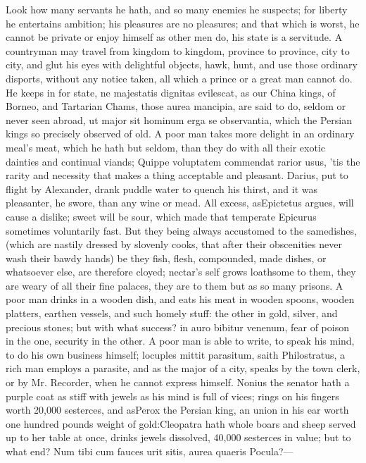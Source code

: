 {Look how many servants he hath, and so many enemies he suspects; for
liberty he entertains ambition; his pleasures are no pleasures; and
that which is worst, he cannot be private or enjoy himself as other men
do, his state is a servitude. A countryman may travel from
kingdom to kingdom, province to province, city to city, and glut his
eyes with delightful objects, hawk, hunt, and use those ordinary
disports, without any notice taken, all which a prince or a great man
cannot do. He keeps in for state, ne majestatis dignitas evilescat, as
our China kings, of Borneo, and Tartarian Chams, those aurea mancipia,
are said to do, seldom or never seen abroad, ut major sit hominum erga
se observantia, which the Persian kings so precisely observed of
old. A poor man takes more delight in an ordinary meal's meat, which he
hath but seldom, than they do with all their exotic dainties and
continual viands; Quippe voluptatem commendat rarior usus, 'tis the
rarity and necessity that makes a thing acceptable and pleasant.
Darius, put to flight by Alexander, drank puddle water to quench his
thirst, and it was pleasanter, he swore, than any wine or mead. All
excess, asEpictetus argues, will cause a dislike; sweet will be
sour, which made that temperate Epicurus sometimes voluntarily fast.
But they being always accustomed to the samedishes, (which are
nastily dressed by slovenly cooks, that after their obscenities never
wash their bawdy hands) be they fish, flesh, compounded, made dishes,
or whatsoever else, are therefore cloyed; nectar's self grows loathsome
to them, they are weary of all their fine palaces, they are to them but
as so many prisons. A poor man drinks in a wooden dish, and eats his
meat in wooden spoons, wooden platters, earthen vessels, and such
homely stuff: the other in gold, silver, and precious stones; but with
what success? in auro bibitur venenum, fear of poison in the one,
security in the other. A poor man is able to write, to speak his mind,
to do his own business himself; locuples mittit parasitum, saith
Philostratus, a rich man employs a parasite, and as the major of
a city, speaks by the town clerk, or by Mr. Recorder, when he cannot
express himself. Nonius the senator hath a purple coat as stiff
with jewels as his mind is full of vices; rings on his fingers worth
20,000 sesterces, and asPerox the Persian king, an union in his
ear worth one hundred pounds weight of gold:Cleopatra hath whole
boars and sheep served up to her table at once, drinks jewels
dissolved, 40,000 sesterces in value; but to what end?
Num tibi cum fauces urit sitis, aurea quaeris
Pocula?---

}
